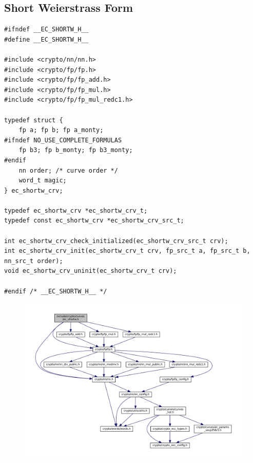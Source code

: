 \subsection{Short Weierstrass Form}
\begin{lstlisting}[style=cstyle, caption={include/curves/ec\_shortw.h}, captionpos=t]
#ifndef __EC_SHORTW_H__
#define __EC_SHORTW_H__

#include <crypto/nn/nn.h>
#include <crypto/fp/fp.h>
#include <crypto/fp/fp_add.h>
#include <crypto/fp/fp_mul.h>
#include <crypto/fp/fp_mul_redc1.h>

typedef struct {
	fp a; fp b; fp a_monty;
#ifndef NO_USE_COMPLETE_FORMULAS
	fp b3; fp b_monty; fp b3_monty;
#endif
	nn order; /* curve order */
	word_t magic;
} ec_shortw_crv;

typedef ec_shortw_crv *ec_shortw_crv_t;
typedef const ec_shortw_crv *ec_shortw_crv_src_t;

int ec_shortw_crv_check_initialized(ec_shortw_crv_src_t crv);
int ec_shortw_crv_init(ec_shortw_crv_t crv, fp_src_t a, fp_src_t b, nn_src_t order);
void ec_shortw_crv_uninit(ec_shortw_crv_t crv);

#endif /* __EC_SHORTW_H__ */
\end{lstlisting}
\begin{figure}[h!]\centering
	\includegraphics[scale=.545]{dep-graph/ec_shortw.pdf}
\end{figure}

\newpage
